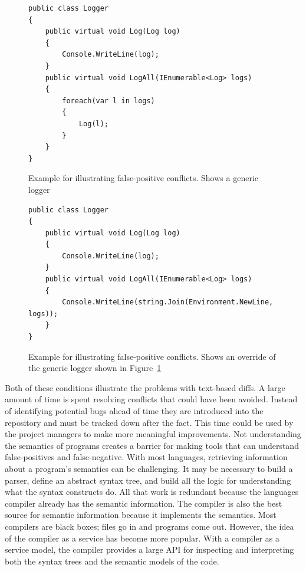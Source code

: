 \documentclass[draftclsnofoot,onecolumn]{IEEEtran}
\begin{document}
\begin{figure}[!htb]
\centering
\begin{lstlisting}
public class Logger
{
    public virtual void Log(Log log)
    {
        Console.WriteLine(log);
    }
    public virtual void LogAll(IEnumerable<Log> logs)
    {
        foreach(var l in logs)
        {
            Log(l);
        }
    }
}
\end{lstlisting}
\caption{Example for illustrating false-positive conflicts. Shows a generic logger}
\label{example1}
\end{figure}

\begin{figure}[!htb]
\centering
\begin{lstlisting}
public class Logger
{
    public virtual void Log(Log log)
    {
        Console.WriteLine(log);
    }
    public virtual void LogAll(IEnumerable<Log> logs)
    {
        Console.WriteLine(string.Join(Environment.NewLine, logs));
    }
}
\end{lstlisting}
\caption{Example for illustrating false-positive conflicts. Shows an override of the generic logger shown in Figure~\ref{example1}}
\label{example2}
\end{figure}

Both of these conditions illustrate the problems with text-based diffs. A large amount of time is spent resolving conflicts that could have been avoided. Instead of identifying potential bugs ahead of time they are introduced into the repository and must be tracked down after the fact. This time could be used by the project managers to make more meaningful improvements. Not understanding the semantics of programs creates a barrier for making tools that can understand false-positives and false-negative. With most languages, retrieving information about a program's semantics can be challenging. It may be necessary to build a parser, define an abstract syntax tree, and build all the logic for understanding what the syntax constructs do. All that work is redundant because the languages compiler already has the semantic information. The compiler is also the best source for semantic information because it implements the semantics. Most compilers are black boxes; files go in and programs come out. However, the idea of the compiler as a service has become more popular. With a compiler as a service model, the compiler provides a large API for inspecting and interpreting both the syntax trees and the semantic models of the code. 
\end{document}
